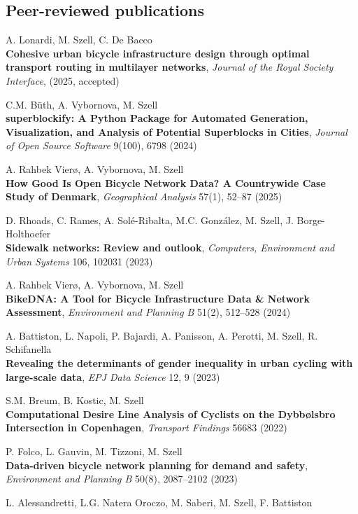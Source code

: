 \documentclass[10pt,a4paper]{article}
\renewenvironment{itemize}{
  \begin{list}{}{
    \setlength{\leftmargin}{1.5em}
    \setlength{\itemsep}{0.25em}
    \setlength{\parskip}{0pt}
    \setlength{\parsep}{0.25em}
  }
}{
  \end{list}
}
\begin{document}
\subsection*{Peer-reviewed publications}
\begin{itemize}
\setlength\itemsep{1em}
\item A. Lonardi, M. Szell, C. De Bacco\\
    \textbf{Cohesive urban bicycle infrastructure design through optimal transport routing in multilayer networks}, \textit{Journal of the Royal Society Interface}, (2025, accepted)
\item C.M. Büth, A. Vybornova, M. Szell\\
    \textbf{superblockify: A Python Package for Automated Generation, Visualization, and Analysis of Potential Superblocks in Cities}, \textit{Journal of Open Source Software} 9(100), 6798 (2024)
\item A. Rahbek Vierø, A. Vybornova, M. Szell\\
    \textbf{How Good Is Open Bicycle Network Data? A Countrywide Case Study of Denmark}, \textit{Geographical Analysis} 57(1), 52--87 (2025)
\item D. Rhoads, C. Rames, A. Solé-Ribalta, M.C. González, M. Szell, J. Borge-Holthoefer\\
    \textbf{Sidewalk networks: Review and outlook}, \textit{Computers, Environment and Urban Systems} 106, 102031 (2023)
\item A. Rahbek Vierø, A. Vybornova, M. Szell\\
    \textbf{BikeDNA: A Tool for Bicycle Infrastructure Data \& Network Assessment}, \textit{Environment and Planning B} 51(2), 512--528 (2024)
\item A. Battiston, L. Napoli, P. Bajardi, A. Panisson, A. Perotti, M. Szell, R. Schifanella\\
    \textbf{Revealing the determinants of gender inequality in urban cycling with large-scale data}, \textit{EPJ Data Science} 12, 9 (2023)
\item S.M. Breum, B. Kostic, M. Szell\\
    \textbf{Computational Desire Line Analysis of Cyclists on the Dybbølsbro Intersection in Copenhagen}, \textit{Transport Findings} 56683 (2022)
\item P. Folco, L. Gauvin, M. Tizzoni, M. Szell\\
    \textbf{Data-driven bicycle network planning for demand and safety}, \textit{Environment and Planning B} 50(8), 2087--2102 (2023)
\item L. Alessandretti, L.G. Natera Oroczo, M. Saberi, M. Szell, F. Battiston\\

\end{itemize}
\end{document}
